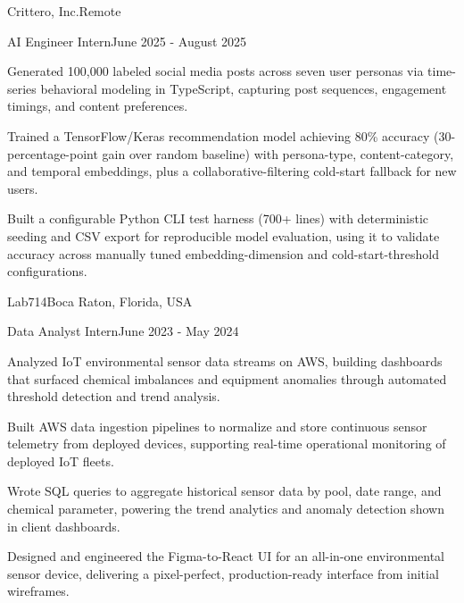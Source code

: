 \documentclass[10pt, letterpaper]{article}
\begin{document}
\begin{leadershipentry}{Crittero, Inc.}{Remote}
	\begin{positionentry}{AI Engineer Intern}{June 2025 - August 2025}
		\item Generated 100,000 labeled social media posts across seven user personas via time-series behavioral modeling in TypeScript, capturing post sequences, engagement timings, and content preferences.
		\item Trained a TensorFlow/Keras recommendation model achieving 80\% accuracy (30-percentage-point gain over random baseline) with persona-type, content-category, and temporal embeddings, plus a collaborative-filtering cold-start fallback for new users.
		\item Built a configurable Python CLI test harness (700+ lines) with deterministic seeding and CSV export for reproducible model evaluation, using it to validate accuracy across manually tuned embedding-dimension and cold-start-threshold configurations.
	\end{positionentry}
\end{leadershipentry}

\begin{leadershipentry}{Lab714}{Boca Raton, Florida, USA}
	\begin{positionentry}{Data Analyst Intern}{June 2023 - May 2024}
		\item Analyzed IoT environmental sensor data streams on AWS, building dashboards that surfaced chemical imbalances and equipment anomalies through automated threshold detection and trend analysis.
		\item Built AWS data ingestion pipelines to normalize and store continuous sensor telemetry from deployed devices, supporting real-time operational monitoring of deployed IoT fleets.
		\item Wrote SQL queries to aggregate historical sensor data by pool, date range, and chemical parameter, powering the trend analytics and anomaly detection shown in client dashboards.
		\item Designed and engineered the Figma-to-React UI for an all-in-one environmental sensor device, delivering a pixel-perfect, production-ready interface from initial wireframes.
	\end{positionentry}
\end{leadershipentry}

\vspace{\headerSpacing}
\end{document}
